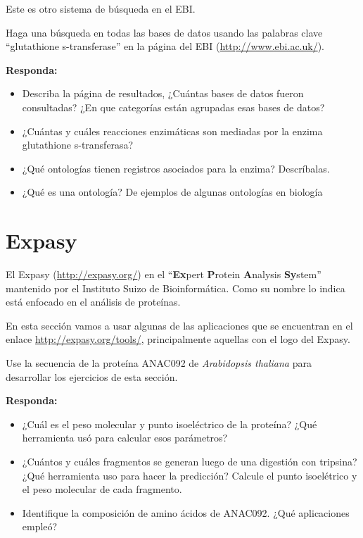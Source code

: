 \documentclass[letter,11pt]{book}
\begin{document}
Este es otro sistema de búsqueda en el EBI.

Haga una búsqueda en todas las bases de datos usando las palabras clave ``glutathione s-transferase'' en la página del EBI (\url{http://www.ebi.ac.uk/}). 

\textbf{Responda:}

{\color{red}
\begin{itemize}
\item Describa la página de resultados, ¿Cuántas bases de datos fueron consultadas? ¿En que categorías están agrupadas esas bases de datos?
\item ¿Cuántas y cuáles reacciones enzimáticas son mediadas por la enzima glutathione s-transferasa?
\item ¿Qué ontologías tienen registros asociados para la enzima? Descríbalas.
\item ¿Qué es una ontología? De ejemplos de algunas ontologías en biología
\end{itemize}
}

\section{Expasy}

El Expasy (\url{http://expasy.org/}) en el ``\textbf{Ex}pert \textbf{P}rotein \textbf{A}nalysis \textbf{Sy}stem'' mantenido por el Instituto Suizo de Bioinformática. Como su nombre lo indica está enfocado en el análisis de proteínas.

En esta sección vamos a usar algunas de las aplicaciones que se encuentran en el enlace \url{http://expasy.org/tools/}, principalmente aquellas con el logo del Expasy.

Use la secuencia de la proteína ANAC092 de \textit{Arabidopsis thaliana} para desarrollar los ejercicios de esta sección.

\textbf{Responda:}

{\color{red}
\begin{itemize}
\item ¿Cuál es el peso molecular y punto isoeléctrico de la proteína? ¿Qué herramienta usó para calcular esos parámetros?
\item ¿Cuántos y cuáles fragmentos se generan luego de una digestión con tripsina? ¿Qué herramienta uso para hacer la predicción? Calcule el punto isoelétrico y el peso molecular de cada fragmento.
\item Identifique la composición de amino ácidos de ANAC092. ¿Qué aplicaciones empleó?
\end{itemize}
}
\end{document}
